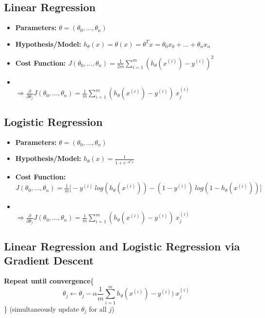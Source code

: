 \documentclass[a4paper,12pt]{article}
\begin{document}
\subsection*{Linear Regression} 

\begin{itemize}
\item[] \textbf{Parameters:} $ {\theta} = (\theta_0,\ldots,\theta_n) $
\item[] \textbf{Hypothesis/Model:} $ h_{\theta}(x) = \theta(x) = \theta^Tx = \theta_0 x_0+\ldots+\theta_n x_n $
\item[] \textbf{Cost Function:} $J(\theta_0,\ldots,\theta_n) = \frac{1}{2m} \sum_{i=1}^{m} (h_{\theta}(x^{(i)})-y^{(i)})^2$
\item[]\ \ \ \ \ \ \ \ \  \  \ \ \ \ \ \ \ \ \ \ \ \  \ \   $\Rightarrow   \frac{\partial }{\partial \theta_j } J(\theta_0,\ldots,\theta_n)  = \frac{1}{m}  \sum_{i=1}^{m} (h_{\theta}(x^{(i)})-y^{(i)}) \ x_j^{(i)} $
\end{itemize}


\subsection*{Logistic Regression} 
\begin{itemize}
\item[] \textbf{Parameters:} $ {\theta} = (\theta_0,\ldots,\theta_n) $
\item[] \textbf{Hypothesis/Model:} $ h_{\theta}(x) =\frac{1}{1+ e^{-\theta^Tx}} $
\item[] \textbf{Cost Function:} $J(\theta_0,\ldots,\theta_n) = \frac{1}{m}\big[-y^{(i)}\ log(h_{\theta}(x^{(i)}))-(1-y^{(i)})\ log(1-h_{\theta}(x^{(i)}))\big]$
\item[]\ \ \ \ \ \ \ \ \  \  \ \ \ \ \ \ \ \ \ \ \ \  \ \   $\Rightarrow   \frac{\partial }{\partial \theta_j } J(\theta_0,\ldots,\theta_n)  = \frac{1}{m}  \sum_{i=1}^{m} (h_{\theta}(x^{(i)})-y^{(i)}) \ x_j^{(i)} $
\end{itemize}

  
 
\subsection*{Linear Regression and Logistic Regression via Gradient Descent} 

\textbf{Repeat until convergence}\big\{
  $$ \theta_j \leftarrow  \theta_j -\alpha \frac{1}{m}  \sum_{i=1}^{m} h_{\theta}(x^{(i)})-y^{(i)}) \ x_j^{(i)}     $$ \big\}
   (simultaneously update $\theta_j$ for all $j$)
\end{document}
